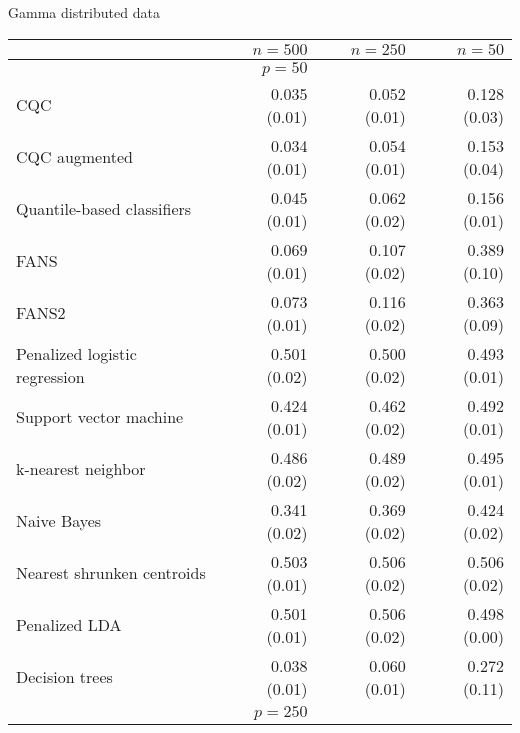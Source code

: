 \begin{table}[p]
  \centering
  Gamma distributed data \\[2ex]
  \begin{adjustbox}{max size={\textwidth}{10cm}}
    \begin{tabular}{l@{\extracolsep{15mm}}rrr}
      
      \hline
      & $n=500$ & $n=250$ & $n=50$ \\ 
      \hline
      & $p = 50$ \\
      \hline

      CQC & 0.035 (0.01) & 0.052 (0.01) & 0.128 (0.03) \\ 
      CQC augmented & 0.034 (0.01) & 0.054 (0.01) & 0.153 (0.04) \\ 
      Quantile-based classifiers & 0.045 (0.01) & 0.062 (0.02) & 0.156 (0.01) \\ 
      FANS  & 0.069 (0.01) & 0.107 (0.02) & 0.389 (0.10) \\
      FANS2 & 0.073 (0.01) & 0.116 (0.02) & 0.363 (0.09) \\
      Penalized logistic regression & 0.501 (0.02) & 0.500 (0.02) & 0.493 (0.01) \\ 
      Support vector machine & 0.424 (0.01) & 0.462 (0.02) & 0.492 (0.01) \\ 
      k-nearest neighbor & 0.486 (0.02) & 0.489 (0.02) & 0.495 (0.01) \\ 
      Naive Bayes & 0.341 (0.02) & 0.369 (0.02) & 0.424 (0.02) \\ 
      Nearest shrunken centroids & 0.503 (0.01) & 0.506 (0.02) & 0.506 (0.02) \\ 
      Penalized LDA & 0.501 (0.01) & 0.506 (0.02) & 0.498 (0.00) \\ 
      Decision trees & 0.038 (0.01) & 0.060 (0.01) & 0.272 (0.11) \\ [2ex]

      \hline
      & $p = 250$ \\
      \hline


\end{tabular}
\end{adjustbox}
\end{table}
